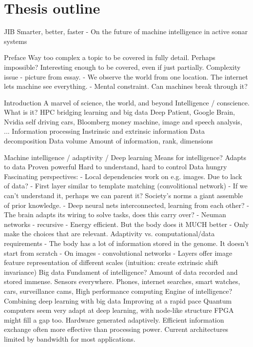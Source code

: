 \section{Thesis outline}

JIB
Smarter, better, faster - On the future of machine intelligence in active sonar systems 

Preface
  Way too complex a topic to be covered in fully detail. Perhaps impossible?
  Interesting enough to be covered, even if just partially.
  Complexity issue - picture from essay.
     - We observe the world from one location. The internet lets machine see everything.
     - Mental constraint. Can machines break through it?
  
Introduction
   A marvel of science, the world, and beyond
      Intelligence / conscience. What is it?
      HPC bridging learning and big data
      Deep Patient, Google Brain, Nvidia self driving cars, Bloomberg money machine, image and speech analysis, ...
   Information processing
      Instrinsic and extrinsic information
      Data decomposition
      Data volume
      Amount of information, rank, dimensions
      
   Machine intelligence / adaptivity / Deep learning
      Means for intelligence?
      Adapts to data
      Proven powerful
      Hard to understand, hard to control
      Data hungry
      Fascinating perspectives:
      - Local dependencies work on e.g. images. Due to lack of data?
      - First layer similar to template matching (convolitional network)
      - If we can't understand it, perhaps we can parent it? Society's norms a giant assemble of prior knowledge.
      - Deep neural nets interconnected, learning from each other?
      - The brain adapts its wiring to solve tasks, does this carry over?
      - Neuman networks - recursive
      - Energy efficient. But the body does it MUCH better
      - Only make the choices that are relevant. Adaptivity vs. computational/data requirements
        - The body has a lot of information stored in the genome. It doesn't start from scratch
      - On images - convolutional networks
        - Layers offer image feature representation of different scales (intuition: create extrinsic shift invariance)
   Big data
      Fundament of intelligence?
      Amount of data recorded and stored immense. Sensors everywhere.
      Phones, internet searches, smart watches, cars, surveillance cams,   
   High performance computing
      Engine of intelligence?
      Combining deep learning with big data
      Improving at a rapid pace
      Quantum computers seem very adapt at deep learning, with node-like structure
      FPGA might fill a gap too. Hardware generated adaptively. Efficient information exchange often more effective than processing power. Current architectures limited by bandwidth for most applications.
      
